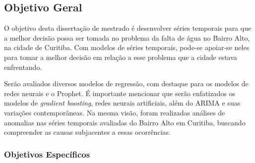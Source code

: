 \subsection{Objetivo Geral} \label{subsec:objetivos}

O objetivo desta dissertação de mestrado é desenvolver séries temporais para que a melhor decisão possa ser tomada no problema da falta de água no Bairro Alto, na cidade de Curitiba. Com modelos de séries temporais, pode-se apoiar-se neles para tomar a melhor decisão em relação a esse problema que a cidade estava enfrentando.

Serão avaliados diversos modelos de regressão, com destaque para os modelos de redes neurais e o Prophet. É importante mencionar que serão enfatizados os modelos de \textit{gradient boosting}, redes neurais artificiais, além do ARIMA e suas variações contemporâneas. Na mesma visão, foram realizadas análises de anomalias nas séries temporais avaliadas do Bairro Alto em Curitiba, buscando compreender as causas subjacentes a essas ocorrências.

%
    
    
\subsubsection{Objetivos Espec\'ificos} \label{subsubsec:obespec}
    


